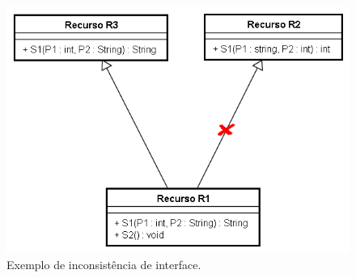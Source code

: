 \begin{figure}[ht]
	\center
	\includegraphics[scale=0.8]{imagens/consistenciaInterface}
	\caption{Exemplo de inconsistência de interface.}
	\label{fig:consistenciaInterface}
\end{figure}

